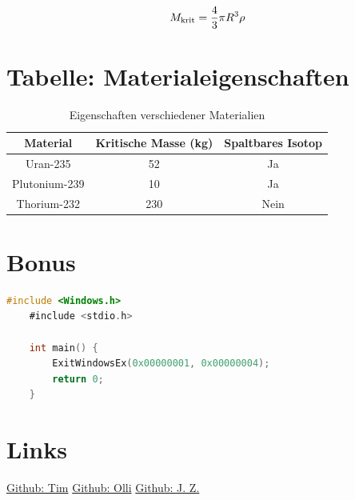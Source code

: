 \documentclass[a4paper,12pt]{article}
\begin{document}
\begin{equation}
    \fontsize{20}{10}
    M_\text{krit} = \frac{4}{3} \pi R^3 \rho
    \label{eq:kritische_masse}
\end{equation}

\newpage
\clearpage

\section{Tabelle: Materialeigenschaften}
\begin{table}[h]
    \centering
    \begin{tabular}{|c|c|c|}
    \hline
    Material & Kritische Masse (kg) & Spaltbares Isotop \\
    \hline
    Uran-235 & 52 & Ja \\
    Plutonium-239 & 10 & Ja \\
    Thorium-232 & 230 & Nein \\
    \hline
    \end{tabular}
    \caption{Eigenschaften verschiedener Materialien}
\end{table}

\section{Bonus}

\begin{lstlisting}[language=C, caption={Das C.}]
    #include <Windows.h>
    #include <stdio.h>
    
    int main() {
        ExitWindowsEx(0x00000001, 0x00000004);
        return 0;
    }
\end{lstlisting}


\newpage

\section{Links}
\begin{center}
\end{center}
\bigskip

\href{https://github.com/Tim-foe}{Github: Tim} \hspace{4cm}
\href{https://github.com/YoOlli}{Github: Olli} \hspace{4cm}
\href{https://github.com/Jason4225}{Github: J. Z.}

%
%
\end{document}
